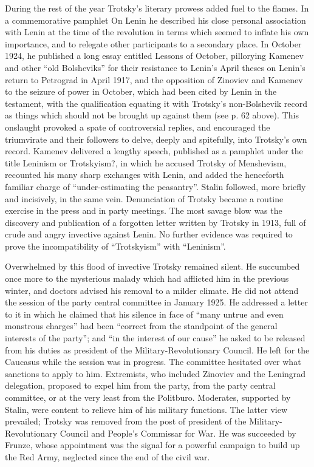 During the rest of the year Trotsky's literary prowess added fuel to the flames. In a commemorative pamphlet On Lenin he described his close personal association with Lenin at the time of the revolution in terms which seemed to inflate his own importance, and to relegate other participants to a secondary place. In October 1924, he published a long essay entitled Lessons of October, pillorying Kamenev and other ``old Bolsheviks'' for their resistance to Lenin's April theses on Lenin's return to Petrograd in April 1917, and the opposition of Zinoviev and Kamenev to the seizure of power in October, which had been cited by Lenin in the testament, with the qualification equating it with Trotsky's non-Bolshevik record as things which should not be brought up against them (see p. 62 above). This onslaught provoked a spate of controversial replies, and encouraged the triumvirate and their followers to delve, deeply and spitefully, into Trotsky's own record. Kamenev delivered a lengthy speech, published as a pamphlet under the title Leninism or Trotskyism?, in which he accused Trotsky of Menshevism, recounted his many sharp exchanges with Lenin, and added the henceforth familiar charge of ``under-estimating the peasantry''. Stalin followed, more briefly and incisively, in the same vein. Denunciation of Trotsky became a routine exercise in the press and in party meetings. The most savage blow was the discovery and publication of a forgotten letter written by Trotsky in 1913, full of crude and angry invective against Lenin. No further evidence was required to prove the incompatibility of ``Trotskyism'' with ``Leninism''. 

Overwhelmed by this flood of invective Trotsky remained silent. He succumbed once more to the mysterious malady which had afflicted him in the previous winter, and doctors advised his removal to a milder climate. He did not attend the session of the party central committee in January 1925. He addressed a letter to it in which he claimed that his silence in face of ``many untrue and even monstrous charges'' had been ``correct from the standpoint of the general interests of the party''; and ``in the interest of our cause'' he asked to be released from his duties as president of the Military-Revolutionary Council. He left for the Caucasus while the session was in progress. The committee hesitated over what sanctions to apply to him. Extremists, who included Zinoviev and the Leningrad delegation, proposed to expel him from the party, from the party central committee, or at the very least from the Politburo. Moderates, supported by Stalin, were content to relieve him of his military functions. The latter view prevailed; Trotsky was removed from the post of president of the Military-Revolutionary Council and People's Commissar for War. He was succeeded by Frunze, whose appointment was the signal for a powerful campaign to build up the Red Army, neglected since the end of the civil war. 


